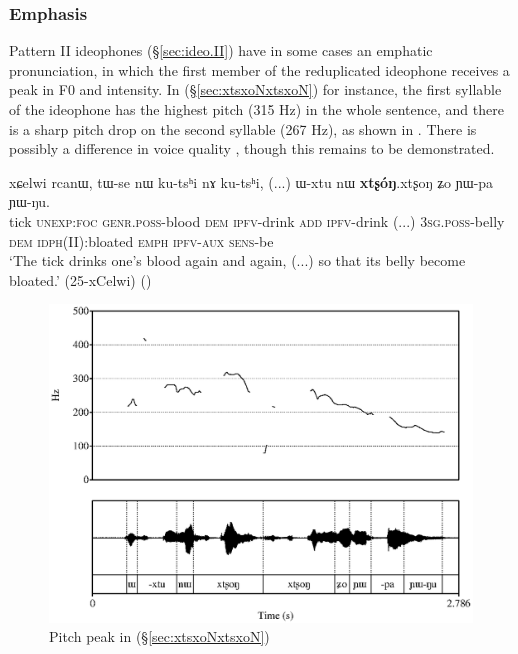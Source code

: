 \subsubsection{Emphasis} \label{sec:emphatic.idph}
Pattern II ideophones (§\ref{sec:ideo.II}) have in some cases an emphatic pronunciation, in which the first member of the reduplicated ideophone receives a peak in F0 and intensity. In (§\ref{sec:xtsxoNxtsxoN}) for instance, the first syllable of the ideophone  has the highest pitch (315 Hz) in the whole sentence, and there is a sharp pitch drop on the second syllable (267 Hz), as shown in . There is possibly a difference in voice quality \citep{japhug14ideophones}, though this remains to be demonstrated.


\begin{exe}
\ex \label{sec:xtsxoNxtsxoN}
\gll xɕelwi rcanɯ, tɯ-se nɯ ku-tsʰi nɤ ku-tsʰi, (...) ɯ-xtu nɯ \textbf{xtʂóŋ}.xtʂoŋ ʑo ɲɯ-pa ɲɯ-ŋu. \\
tick \textsc{unexp}:\textsc{foc} \textsc{genr}.\textsc{poss}-blood \textsc{dem} \textsc{ipfv}-drink \textsc{add} \textsc{ipfv}-drink (...) \textsc{3sg}.\textsc{poss}-belly \textsc{dem} \textsc{idph}(II):bloated \textsc{emph} \textsc{ipfv}-\textsc{aux} \textsc{sens}-be \\
\glt `The tick drinks one's blood again and again, (...) so that its belly become bloated.' (25-xCelwi) ()
\end{exe}


\begin{figure}
\caption{Pitch peak in (§\ref{sec:xtsxoNxtsxoN})} \label{fig:xtsxoN}
\includegraphics[width=\textwidth]{xtsxoN.eps}
\end{figure}

